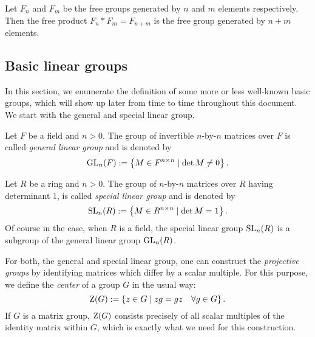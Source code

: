 \begin{example}
Let $F_n$ and $F_m$ be the free groups generated by $n$ and $m$ elements respectively. Then the free product $F_n \ast F_m = F_{n+m}$ is the free group generated by $n+m$ elements.
\end{example}

\subsection{Basic linear groups}

In this section, we enumerate the definition of some more or less well-known basic groups, which will show up later from time to time throughout this document. We start with the general and special linear group.

\begin{definition}
\label{dfn_GenLinGrp}
Let $F$ be a field and $n > 0$. The group of invertible $n$-by-$n$ matrices over  $F$ is called \emph{general linear group} and is denoted by
\begin{equation}
\label{eqn_GeneralLinearGroup}
\operatorname{GL}_{n}(F) := \left\{M \in {F}^{n \times n} \mid \det M \ne 0\right\}.
\end{equation}
\end{definition}

\begin{definition}
\label{dfn_SpLinGrp}
Let $R$ be a ring and $n > 0$. The group of $n$-by-$n$ matrices over $R$ having determinant 1, is called \emph{special linear group} and is denoted by
\begin{equation}
\label{eqn_SpecialLinearGroup}
\operatorname{SL}_{n}(R) := \left\{M \in {R}^{n \times n} \mid \det M = 1\right\}.
\end{equation}
Of course in the case, when $R$ is a field, the special linear group $\operatorname{SL}_{n}(R)$ is a subgroup of the general linear group $\operatorname{GL}_{n}(R)$. 
\end{definition}

For both, the general and special linear group, one can construct the \emph{projective groups} by identifying matrices which differ by a scalar multiple. For this purpose, we define the \emph{center} of a group $G$ in the usual way:
\begin{equation}
\operatorname{Z}(G) := \left\{z \in G \mid zg = gz \quad \forall g \in G\right\}.
\end{equation}
If $G$ is a matrix group, $\operatorname{Z}(G)$ consists precisely of all scalar multiples of the identity matrix within $G$, which is exactly what we need for this construction.

